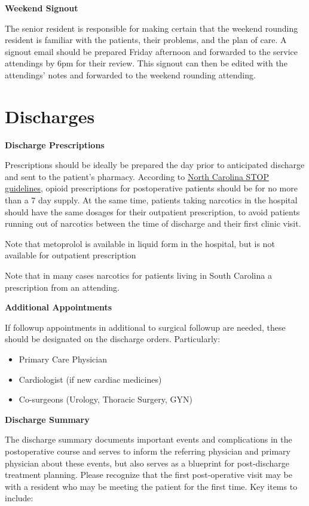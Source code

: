 \documentclass[
  letterpaper,
]{scrbook}
\providecommand{\tightlist}{%
  \setlength{\itemsep}{0pt}\setlength{\parskip}{0pt}}
\begin{document}
\textbf{Weekend Signout}

The senior resident is responsible for making certain that the weekend
rounding resident is familiar with the patients, their problems, and the
plan of care. A signout email should be prepared Friday afternoon and
forwarded to the service attendings by 6pm for their review. This
signout can then be edited with the attendings' notes and forwarded to
the weekend rounding attending.

\chapter{Discharges}\label{discharges}

\textbf{Discharge Prescriptions}

Prescriptions should be ideally be prepared the day prior to anticipated
discharge and sent to the patient's pharmacy. According to
\href{https://www.ncmedboard.org/images/uploads/license_applications/STOPAct-focusedFAQs-Sept2019.pdf}{North
Carolina STOP guidelines}, opioid prescriptions for postoperative
patients should be for no more than a 7 day supply. At the same time,
patients taking narcotics in the hospital should have the same dosages
for their outpatient prescription, to avoid patients running out of
narcotics between the time of discharge and their first clinic visit.

Note that metoprolol is available in liquid form in the hospital, but is
not available for outpatient prescription

Note that in many cases narcotics for patients living in South Carolina
a prescription from an attending.

\textbf{Additional Appointments}

If followup appointments in additional to surgical followup are needed,
these should be designated on the discharge orders. Particularly:

\begin{itemize}
\tightlist
\item
  Primary Care Physician
\item
  Cardiologist (if new cardiac medicines)
\item
  Co-surgeons (Urology, Thoracic Surgery, GYN)
\end{itemize}

\textbf{Discharge Summary}

The discharge summary documents important events and complications in
the postoperative course and serves to inform the referring physician
and primary physician about these events, but also serves as a blueprint
for post-discharge treatment planning. Please recognize that the first
post-operative visit may be with a resident who may be meeting the
patient for the first time. Key items to include:
\end{document}
